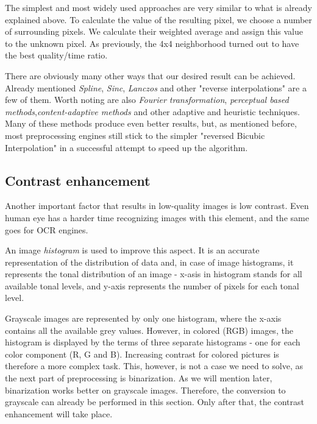 \begin{description}
The simplest and most widely used approaches are very similar to what is already explained above. To calculate the value of the resulting pixel, we choose a number of surrounding pixels. We calculate their weighted average and assign this value to the unknown pixel. As previously, the 4x4 neighborhood turned out to have the best quality/time ratio.

There are obviously many other ways that our desired result can be achieved. Already mentioned \emph{Spline}, \emph{Sinc}, \emph{Lanczos} and other "reverse interpolations" are a few of them. Worth noting are also \emph{Fourier transformation}, \emph{perceptual based methods},\emph{content-adaptive methods} and other adaptive and heuristic techniques.
Many of these methods produce even better results, but, as mentioned before, most preprocessing engines still stick to the simpler "reversed Bicubic Interpolation" in a successful attempt to speed up the algorithm.

\end{description}

\subsection{Contrast enhancement}

Another important factor that results in low-quality images is low contrast. Even human eye has a harder time recognizing images 
with this element, and the same goes for OCR engines. 

An image \emph{histogram} is used to improve this aspect. It is an accurate representation of the distribution of data and, in case of image histograms, it represents the tonal distribution of an image - x-asis in histogram stands for all available tonal levels, and y-axis represents the number of pixels for each tonal level.

Grayscale images are represented by only one histogram, where the x-axis contains all the available grey values. However, in colored (RGB) images, the histogram is displayed by the terms of three separate histograms - one for each color component (R, G and B). Increasing contrast for colored pictures is therefore a more complex task. This, however, is not a case we need to solve, as the next part of preprocessing is binarization. As we will mention later, binarization works better on grayscale images. Therefore, the conversion to grayscale can already be performed in this section. Only after that, the contrast enhancement will take place.

